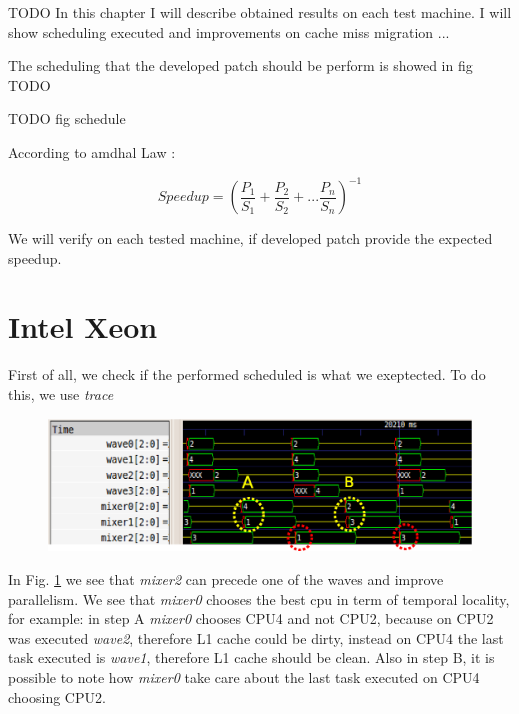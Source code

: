 TODO
In this chapter I will describe obtained results on each test machine. I will show scheduling executed and improvements on cache miss migration  ...

The scheduling that the developed patch should be perform is showed in fig TODO

TODO fig schedule

According to amdhal Law \cite{lcs}:
	
\begin{equation}
       Speedup = (\frac{P_{1}}{S_{1}} + \frac{P_{2}}{S_{2}} + ... \frac{P_{n}}{S_{n}})^{-1} 
\label{eq:amdhal}
\end{equation}

We will verify on each tested machine, if developed patch provide the expected speedup.

\section{Intel Xeon}

First of all, we check if the performed scheduled is what we exeptected. To do this, we use \textit{trace}

\begin{figure}[htbp]
\centering
\includegraphics[width=\widefigure]{images/results_xeon/final_xeon.eps}
\caption{}
\label{fig:trace_xeon}
\end{figure}

In Fig. \ref{fig:trace_xeon} we see that \textit{mixer2} can precede one of the waves and improve parallelism. We see that \textit{mixer0} chooses the best
cpu in term of temporal locality, for example: in step A \textit{mixer0} chooses CPU4 and not CPU2, because on CPU2 was executed \textit{wave2}, therefore 
L1 cache could be dirty, instead on CPU4 the last task executed is \textit{wave1}, therefore L1 cache should be clean. Also in step B, it is possible to 
note how \textit{mixer0} take care about the last task executed on CPU4 choosing CPU2.

